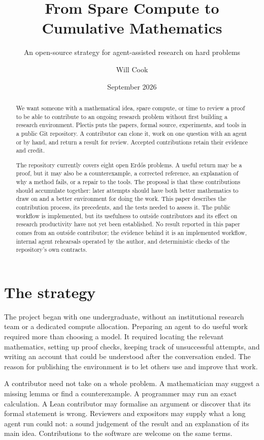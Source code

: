 \documentclass[10pt]{article}
\title{From Spare Compute to Cumulative Mathematics}
\subtitle{An open-source strategy for agent-assisted research on hard problems}
\author{Will Cook}
\date{September 2026}
\begin{document}
\maketitle
\paperprovenance
\fontsize{9.2pt}{11pt}\selectfont

\begin{abstract}
We want someone with a mathematical idea, spare compute, or time to review a
proof to be able to contribute to an ongoing research problem without first
building a research environment. Plectis puts the papers, formal source,
experiments, and tools in a public Git repository. A contributor can clone it,
work on one question with an agent or by hand, and return a result for review.
Accepted contributions retain their evidence and credit.

The repository currently covers eight open Erd\H{o}s problems. A useful return
may be a proof, but it may also be a counterexample, a corrected reference, an
explanation of why a method fails, or a repair to the tools. The proposal is
that these contributions should accumulate together: later attempts should
have both better mathematics to draw on and a better environment for doing
the work. This paper describes the contribution process, its precedents, and
the tests needed to assess it. The public workflow is implemented, but its
usefulness to outside contributors and its
effect on research productivity have not yet been established. No result
reported in this paper comes from an outside contributor; the evidence behind
it is an implemented workflow, internal agent rehearsals operated by the
author, and deterministic checks of the repository's own contracts.
\end{abstract}

\section{The strategy}\label{sec:strategy}

The project began with one undergraduate, without an institutional research
team or a dedicated compute allocation. Preparing an agent to do useful work
required more than choosing a model. It required locating the relevant
mathematics, setting up proof checks, keeping track of unsuccessful attempts,
and writing an account that could be understood after the conversation ended.
The reason for publishing the environment is to let others use and improve
that work.

A contributor need not take on a whole problem. A mathematician may suggest a
missing lemma or find a counterexample. A programmer may run an exact
calculation. A Lean contributor may formalise an argument or discover that its
formal statement is wrong. Reviewers and expositors may supply what a long
agent run could not: a sound judgement of the result and an explanation of its
main idea. Contributions to the software are welcome on the same terms.
\end{document}

